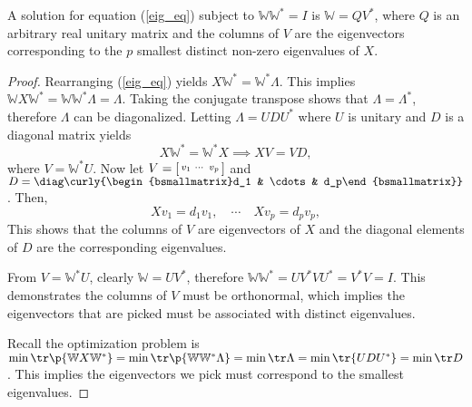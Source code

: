 \documentclass[letterpaper, 10 pt, conference]{ieeeconf}  %
\newcommand{\mbb}[1]{\mathbb{#1}}
\begin{document}
\begin{theorem} \label{opt_thm}
        A solution for equation (\ref{eig_eq}) subject to \(\mbb{W}\mbb{W}^* = I\) is \(\mathbb{W} = QV^*\), where \(Q\) is an arbitrary real unitary matrix and the columns of \(V\) are the eigenvectors corresponding to the \(p\) smallest distinct non-zero eigenvalues of \(X\).  

        \begin{proof}
                Rearranging (\ref{eig_eq}) yields \(X\mbb{W}^* = \mbb{W}^*\Lambda\).  This implies \(\mbb{W}X\mbb{W}^* = \mbb{W}\mbb{W}^*\Lambda = \Lambda\).  Taking the conjugate transpose shows that \(\Lambda = \Lambda^*\), therefore \(\Lambda\) can be diagonalized.  Letting \(\Lambda = UDU^*\) where \(U\) is unitary and \(D\) is a diagonal matrix yields
                \[X\mbb{W}^* = \mbb{W}^* X \implies XV = VD,\]
                where \(V = \mbb{W}^* U\).  Now let \(V = \begin{bsmallmatrix}v_1 & \cdots & v_p\end{bsmallmatrix}\) and \(D = \diag\curly{\begin{bsmallmatrix}d_1 & \cdots & d_p\end{bsmallmatrix}}\).  Then,
                \[Xv_1 = d_1 v_1, \quad \cdots \quad Xv_p = d_p v_p,\]
                This shows that the columns of \(V\) are eigenvectors of \(X\) and the diagonal elements of \(D\) are the corresponding eigenvalues.  
                
                From \(V=\mbb{W}^*U\), clearly \(\mbb{W} = UV^*\), therefore \(\mbb{W}\mbb{W}^* = UV^*VU^* = V^*V = I\).  This demonstrates the columns of \(V\) must be orthonormal, which implies the eigenvectors that are picked must be associated with distinct eigenvalues.  
                
                Recall the optimization problem is \(\min\tr\p{\mbb{W}X\mbb{W}^*} = \min\tr\p{\mbb{W}\mbb{W}^*\Lambda} = \min\tr\Lambda = \min\tr{UDU^*} = \min\tr D\).  This implies the eigenvectors we pick must correspond to the smallest eigenvalues.    
        \end{proof}
\end{theorem}
\end{document}
